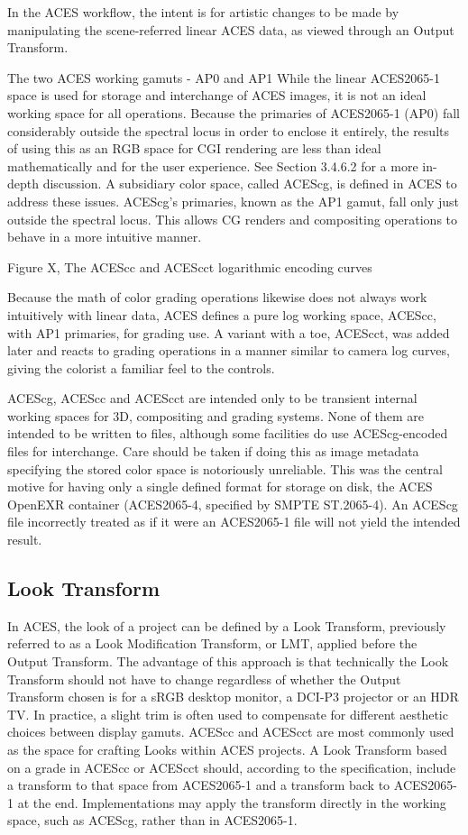 In the ACES workflow, the intent is for artistic changes to be made by manipulating the scene-referred linear ACES data, as viewed through an Output Transform. 

The two ACES working gamuts - AP0 and AP1
While the linear ACES2065-1 space is used for storage and interchange of ACES images, it is not an ideal working space for all operations. Because the primaries of ACES2065-1 (AP0) fall considerably outside the spectral locus in order to enclose it entirely, the results of using this as an RGB space for CGI rendering are less than ideal mathematically and for the user experience. See Section 3.4.6.2 for a more in-depth discussion. A subsidiary color space, called ACEScg, is defined in ACES to address these issues. ACEScg’s primaries, known as the AP1 gamut, fall only just outside the spectral locus. This allows CG renders and compositing operations to behave in a more intuitive manner.
     
Figure X, The ACEScc and ACEScct logarithmic encoding curves

Because the math of color grading operations likewise does not always work intuitively with linear data, ACES defines a pure log working space, ACEScc, with AP1 primaries, for grading use. A variant with a toe, ACEScct, was added later and reacts to grading operations in a manner similar to camera log curves, giving the colorist a familiar feel to the controls.

ACEScg, ACEScc and ACEScct are intended only to be transient internal working spaces for 3D, compositing and grading systems. None of them are intended to be written to files, although some facilities do use ACEScg-encoded files for interchange. Care should be taken if doing this as image metadata specifying the stored color space is notoriously unreliable. This was the central motive for having only a single defined format for storage on disk, the ACES OpenEXR container (ACES2065-4, specified by SMPTE ST.2065-4). An ACEScg file incorrectly treated as if it were an ACES2065-1 file will not yield the intended result.

\subsection{Look Transform}

In ACES, the look of a project can be defined by a Look Transform, previously referred to as a Look Modification Transform, or LMT, applied before the Output Transform. The advantage of this approach is that technically the Look Transform should not have to change regardless of whether the Output Transform chosen is for a sRGB desktop monitor, a DCI-P3 projector or an HDR TV. In practice, a slight trim is often used to compensate for different aesthetic choices between display gamuts. ACEScc and ACEScct are most commonly used as the space for crafting Looks within ACES projects. A Look Transform based on a grade in ACEScc or ACEScct should, according to the specification, include a transform to that space from ACES2065-1 and a transform back to ACES2065-1 at the end. Implementations may apply the transform directly in the working space, such as ACEScg, rather than in ACES2065-1.

